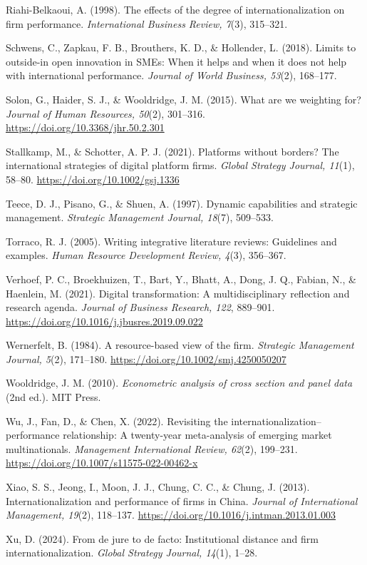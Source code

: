 \documentclass[12pt,a4paper]{article}
\begin{document}
Riahi-Belkaoui, A. (1998). The effects of the degree of
internationalization on firm performance. \emph{International Business
Review, 7}(3), 315--321.

Schwens, C., Zapkau, F. B., Brouthers, K. D., \& Hollender, L. (2018).
Limits to outside-in open innovation in SMEs: When it helps and when it
does not help with international performance. \emph{Journal of World
Business, 53}(2), 168--177.

Solon, G., Haider, S. J., \& Wooldridge, J. M. (2015). What are we
weighting for? \emph{Journal of Human Resources, 50}(2), 301--316.
\url{https://doi.org/10.3368/jhr.50.2.301}

Stallkamp, M., \& Schotter, A. P. J. (2021). Platforms without borders?
The international strategies of digital platform firms. \emph{Global
Strategy Journal, 11}(1), 58--80. \url{https://doi.org/10.1002/gsj.1336}

Teece, D. J., Pisano, G., \& Shuen, A. (1997). Dynamic capabilities and
strategic management. \emph{Strategic Management Journal, 18}(7),
509--533.

Torraco, R. J. (2005). Writing integrative literature reviews:
Guidelines and examples. \emph{Human Resource Development Review, 4}(3),
356--367.

Verhoef, P. C., Broekhuizen, T., Bart, Y., Bhatt, A., Dong, J. Q.,
Fabian, N., \& Haenlein, M. (2021). Digital transformation: A
multidisciplinary reflection and research agenda. \emph{Journal of
Business Research, 122}, 889--901.
\url{https://doi.org/10.1016/j.jbusres.2019.09.022}

Wernerfelt, B. (1984). A resource-based view of the firm.
\emph{Strategic Management Journal, 5}(2), 171--180.
\url{https://doi.org/10.1002/smj.4250050207}

Wooldridge, J. M. (2010). \emph{Econometric analysis of cross section
and panel data} (2nd ed.). MIT Press.

Wu, J., Fan, D., \& Chen, X. (2022). Revisiting the
internationalization--performance relationship: A twenty-year
meta-analysis of emerging market multinationals. \emph{Management
International Review, 62}(2), 199--231.
\url{https://doi.org/10.1007/s11575-022-00462-x}

Xiao, S. S., Jeong, I., Moon, J. J., Chung, C. C., \& Chung, J. (2013).
Internationalization and performance of firms in China. \emph{Journal of
International Management, 19}(2), 118--137.
\url{https://doi.org/10.1016/j.intman.2013.01.003}

Xu, D. (2024). From de jure to de facto: Institutional distance and firm
internationalization. \emph{Global Strategy Journal, 14}(1), 1--28.
\end{document}
